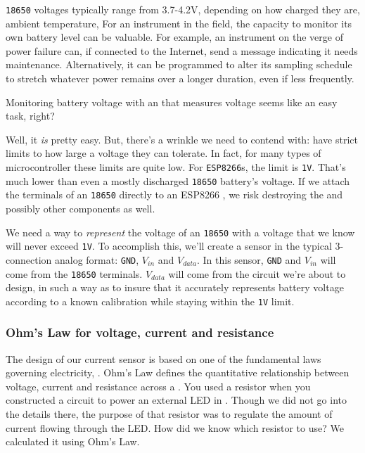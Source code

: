 \texttt{18650} voltages typically range from 3.7-4.2V, depending on how charged they are, ambient temperature, \etc
For an instrument in the field, the capacity to monitor its own battery level can be valuable.
For example, an instrument on the verge of power failure can, if connected to the Internet, send a message indicating it needs maintenance.
Alternatively, it can be programmed to alter its sampling schedule to stretch whatever power remains over a longer duration, even if less frequently.

Monitoring battery voltage with an \adc that measures voltage seems like an easy task, right?

Well, it \emph{is} pretty easy.
But, there's a wrinkle we need to contend with: \adcs have strict limits to how large a voltage they can tolerate.
In fact, for many types of microcontroller these limits are quite low.
For \texttt{ESP8266}s, the limit is \texttt{1V}.
That's much lower than even a mostly discharged \texttt{18650} battery's voltage.
If we attach the terminals of an \texttt{18650} directly to an ESP8266 \adc, we risk destroying the \adc and possibly other components as well.

We need a way to \emph{represent} the voltage of an \texttt{18650} with a voltage that we know will never exceed \texttt{1V}.
To accomplish this, we'll create a sensor in the typical 3-connection analog format: \texttt{GND}, $V_{in}$ and $V_{data}$.
In this sensor, \texttt{GND} and $V_{in}$ will come from the \texttt{18650} terminals. 
$V_{data}$ will come from the circuit we're about to design, in such a way as to insure that it accurately represents battery voltage according to a known calibration while staying within the \texttt{1V} limit.

\subsubsection{Ohm's Law for voltage, current and resistance}
The design of our current sensor is based on one of the fundamental laws governing electricity, .
Ohm's Law defines the quantitative relationship between voltage, current and resistance across a .
You used a resistor when you constructed a circuit to power an external LED in .
Though we did not go into the details there, the purpose of that resistor was to regulate the amount of current flowing through the LED. 
How did we know which resistor to use?
We calculated it using Ohm's Law.

